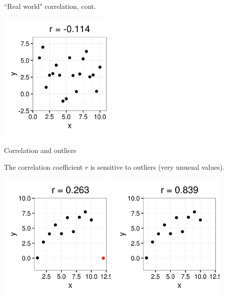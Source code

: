 \documentclass[xcolor=table]{beamer}
\begin{document}
\begin{frame}{``Real world" correlation, cont.}

{\centering
\includegraphics[width=2.25in]{../images/ch10_cor_zero2}
\par}
\end{frame}

\begin{frame}{Correlation and outliers}
\begin{block}{}
The correlation coefficient $r$ is sensitive to outliers (very unusual values).
\end{block}
{\centering
\includegraphics[width=2.25in]{../images/ch10_cor_w_out}
\pause\includegraphics[width=2.25in]{../images/ch10_cor_wo_out}
\par}
\end{frame}
\end{document}
